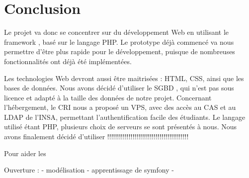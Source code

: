 
	\chapter*{Conclusion}

Le projet va donc se concentrer sur du développement Web en utilisant le framework \symfony, basé sur le langage PHP.
Le prototype déjà commencé va nous permettre d'être plus rapide pour le développement, puisque de nombreuses fonctionnalités ont déjà été implémentées. 

Les technologies Web devront aussi être maitrisées : HTML, CSS, ainsi que les bases de données. Nous avons décidé d'utiliser le SGBD \mdb, qui n'est pas sous licence et adapté à la taille des données de notre projet. Concernant l'hébergement, le CRI nous a proposé un VPS, avec des accès au CAS et au LDAP de l'INSA, permettant l'authentification facile des étudiants. Le langage utilisé étant PHP, plusieurs choix de serveurs se sont présentés à nous. Nous avons finalement décidé d'utiliser !!!!!!!!!!!!!!!!!!!!!!!!!!!!!!!!!!!!!!!!!!

Pour aider les \ris



Ouverture : 
 - modélisation
 - apprentissage de symfony
 - 